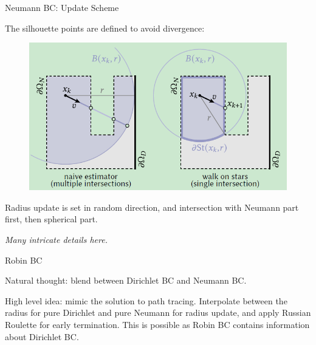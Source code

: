 \documentclass{beamer}
\begin{document}
\begin{frame}{Neumann BC: Update Scheme}

	The silhouette points are defined to avoid divergence:
	\begin{figure}[htbp]
		\centering
		\includegraphics[scale=0.4]{img/NBC-3.png}
	\end{figure}
	Radius update is set in random direction, and intersection with Neumann part first, then spherical part.

	\vspace*{1em}
	\emph{Many intricate details here.}

\end{frame}

\begin{frame}{Robin BC}

	Natural thought: blend between Dirichlet BC and Neumann BC.

	\vspace*{1em}
	High level idea: mimic the solution to path tracing. Interpolate between the radius for pure Dirichlet and pure Neumann for radius update, and apply Russian Roulette for early termination. This is possible as Robin BC contains information about Dirichlet BC.
\end{frame}
\end{document}
